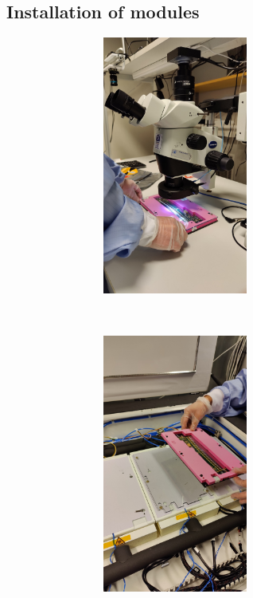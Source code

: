 \newpage
\subsection{Installation of modules}
\begin{figure}[h]    
    \begin{subfigure}[b]{0.4\textwidth}
        \centering
        \includegraphics[width=7cm,height=8.5cm,keepaspectratio]{Figures/test/installation-4.jpg}
        \caption{}\label{fig:peltier1}
    \end{subfigure}
    ~
    \begin{subfigure}[b]{0.4\textwidth}
        \centering
        \includegraphics[width=7cm,height=8.5cm,keepaspectratio]{Figures/test/installation-2.jpg}
        \caption{}\label{fig:peltier2}
    \end{subfigure}


\end{figure}
